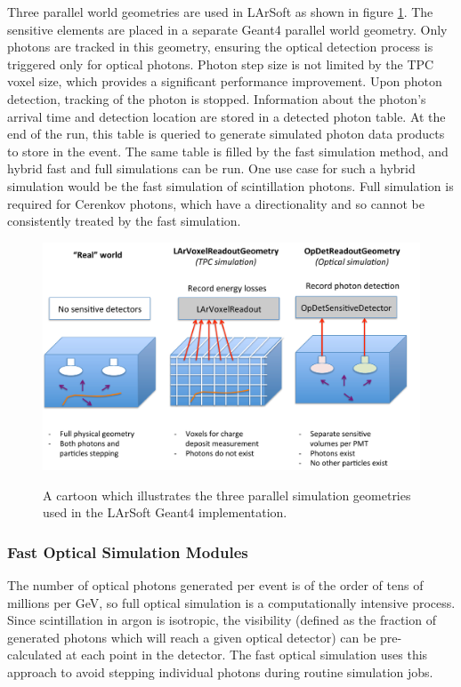\documentclass[12pt]{elsarticle}
\begin{document}
Three parallel world geometries are used in LArSoft as shown in figure \ref{fig:parallelgeom}.
The sensitive elements are placed in a separate Geant4 parallel world geometry.  Only photons are tracked in this geometry, ensuring the optical  detection process is triggered only for optical photons.  Photon step size is not limited by the TPC voxel size, which provides a significant performance improvement. Upon photon detection, tracking of the photon is stopped. Information about the photon's arrival time and detection location are stored in a detected photon table.  At the end of the run, this table is queried to generate simulated photon data products to store in the event.  The same table is filled by the fast simulation method, and hybrid fast and full simulations can be run.  One use case for such a hybrid simulation would be the fast simulation of scintillation photons. Full simulation is required for Cerenkov photons, which have a directionality and so cannot be consistently treated by the fast simulation.


\begin{figure}[h]
\centering
\caption{A cartoon which illustrates the three parallel simulation geometries used in the LArSoft
Geant4 implementation.}
\includegraphics[width=6.0in]{./mtrls/imgs/ParallelGeomScheme.pdf}
\label{fig:parallelgeom}
\end{figure}

\subsubsection{Fast Optical Simulation Modules}

The number of optical photons generated per event is of the order of tens of millions per GeV, so full optical simulation is a computationally intensive process.  Since scintillation in argon is isotropic, the visibility (defined as the fraction of generated photons which will reach a given optical detector) can be pre-calculated at each point in the detector.  The fast optical simulation uses this approach to avoid stepping individual photons during routine simulation jobs.
\end{document}
